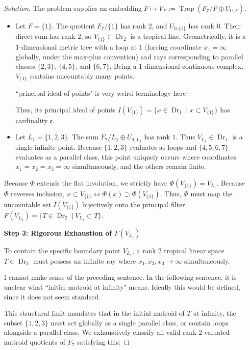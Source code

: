 \documentclass[12pt]{article}
\DeclareMathOperator{\Trop}{Trop}
\DeclareMathOperator{\Dr}{Dr}
\newcommand{\review}[1]{\begin{reviewbox}#1\end{reviewbox}}
\begin{document}
\begin{proof}[Solution]
The problem supplies an embedding $F \mapsto V_F := \Trop(F_7/F \oplus U_{0,F})$.
\begin{itemize}
    \item Let $F = \{1\}$. The quotient $F_7/\{1\}$ has rank $2$, and $U_{0,\{1\}}$ has rank $0$. Their direct sum has rank $2$, so $V_{\{1\}} \in \Dr_2$ is a tropical line. Geometrically, it is a $1$-dimensional metric tree with a loop at $1$ (forcing coordinate $x_1 = \infty$ globally, under the max-plus convention) and rays corresponding to parallel classes $\{2,3\}$, $\{4,5\}$, and $\{6,7\}$. Being a $1$-dimensional continuous complex, $V_{\{1\}}$ contains uncountably many points.
    \review{``principal ideal of points" is very weird terminology here}
    Thus, its principal ideal of points $I(V_{\{1\}}) = \{ x \in \Dr_1 \mid x \subset V_{\{1\}} \}$ has cardinality $\mathfrak{c}$.
    \item Let $L_1 = \{1,2,3\}$. The sum $F_7/L_1 \oplus U_{0,L_1}$ has rank $1$. Thus $V_{L_1} \in \Dr_1$ is a single infinite point. Because $\{1,2,3\}$ evaluates as loops and $\{4,5,6,7\}$ evaluates as a parallel class, this point uniquely occurs where coordinates $x_1 = x_2 = x_3 = \infty$ simultaneously, and the others remain finite.
\end{itemize}

Because $\Phi$ extends the flat involution, we strictly have $\Phi(V_{\{1\}}) = V_{L_1}$. Because $\Phi$ reverses inclusion, $x \subset V_{\{1\}} \iff \Phi(x) \supset \Phi(V_{\{1\}})$. Thus, $\Phi$ must map the uncountable set $I(V_{\{1\}})$ bijectively onto the principal filter $F(V_{L_1}) = \{ T \in \Dr_2 \mid V_{L_1} \subset T \}$.

\medskip
\noindent \textbf{Step 3: Rigorous Exhaustion of $F(V_{L_1})$}

To contain the specific boundary point $V_{L_1}$, a rank $2$ tropical linear space $T \in \Dr_2$ must possess an infinite ray where $x_1, x_2, x_3 \to \infty$ simultaneously.
\review{I cannot make sense of the preceding sentence. In the following sentence, it is unclear what ``initial matroid at infinity" means. Ideally this would be defined, since it does not seem standard.}
This structural limit mandates that in the initial matroid of $T$ at infinity, the subset $\{1,2,3\}$ must act globally as a single parallel class, or contain loops alongside a parallel class. We exhaustively classify all valid rank $2$ valuated matroid quotients of $F_7$ satisfying this:


\end{proof}
\end{document}
